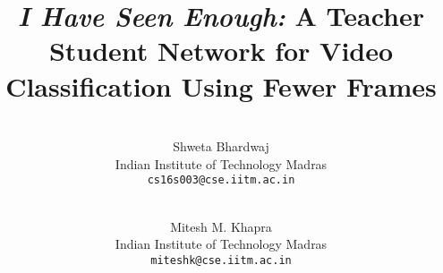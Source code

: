 \documentclass[10pt,twocolumn,letterpaper]{article}
\begin{document}
\title{\textit{I Have Seen Enough:} A Teacher Student Network for Video Classification Using Fewer Frames}

\author{\\
Shweta Bhardwaj\\
Indian Institute of Technology Madras\\
{\tt\small cs16s003@cse.iitm.ac.in}
\and
\\
Mitesh M. Khapra\\
Indian Institute of Technology Madras\\
{\tt\small miteshk@cse.iitm.ac.in}
}

\maketitle
\end{document}
